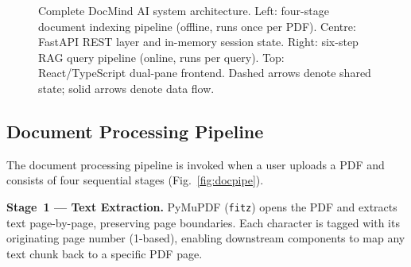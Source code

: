 \documentclass[conference]{IEEEtran}
\begin{document}
\begin{figure}[!ht]
{
}%
\caption{Complete DocMind AI system architecture.
         Left: four-stage document indexing pipeline (offline, runs once per PDF).
         Centre: FastAPI REST layer and in-memory session state.
         Right: six-step RAG query pipeline (online, runs per query).
         Top: React/TypeScript dual-pane frontend.
         Dashed arrows denote shared state; solid arrows denote data flow.}
\label{fig:arch}
\end{figure}

\subsection{Document Processing Pipeline}
The document processing pipeline is invoked when a user uploads a PDF
and consists of four sequential stages (Fig.~\ref{fig:docpipe}).

\textbf{Stage~1 --- Text Extraction.}
PyMuPDF (\texttt{fitz}) opens the PDF and extracts text page-by-page,
preserving page boundaries.
Each character is tagged with its originating page number (1-based),
enabling downstream components to map any text chunk back to a specific
PDF page.
\end{document}
